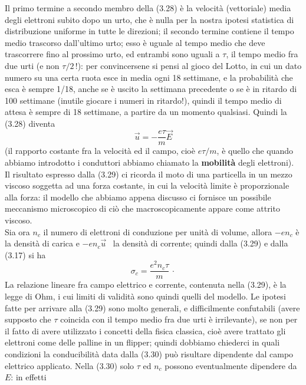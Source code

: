 Il primo termine a secondo membro della (3.28) \`e la velocit\`a (vettoriale)
media degli elettroni subito dopo un urto, che \`e nulla per la nostra ipotesi
statistica di distribuzione uniforme in tutte le direzioni; il secondo termine
contiene il tempo medio trascorso dall'ultimo urto; esso \`e uguale al tempo
medio che deve trascorrere fino al prossimo urto, ed entrambi sono uguali a
$\tau$, il tempo medio fra due urti (e non $\tau/2\,$!): per convincersene si
pensi al gioco del Lotto, in cui un dato numero su una certa ruota esce in media
ogni 18 settimane, e la probabilit\`a che esca \`e sempre 1/18, anche se \`e
uscito la settimana precedente o se \`e in ritardo di 100 settimane (inutile
giocare i numeri in ritardo!), quindi il tempo medio di attesa \`e sempre di 18
settimane, a partire da un momento qualsiasi. Quindi la (3.28) diventa
\begin{equation}
  \vec u=-\frac{e\tau}{m}\vec E
  \tag{3.29}
\end{equation}
(il rapporto costante fra la velocit\`a ed il campo, cio\`e $e\tau/m$, \`e
quello che quando abbiamo introdotto i conduttori abbiamo chiamato la
\textbf{mobilit\`a} degli elettroni).\\
Il risultato espresso dalla (3.29) ci ricorda il moto di una particella in un
mezzo viscoso soggetta ad una forza costante, in cui la velocit\`a limite \`e
proporzionale alla forza: il modello che abbiamo appena discusso ci fornisce un
possibile meccanismo microscopico di ci\`o che macroscopicamente appare come
attrito viscoso.\\
Sia ora $n_c$ il numero di elettroni di conduzione per unit\`a di volume, allora
$-en_c$ \`e la densit\`a di carica e $-en_c\vec u$ \ la densit\`a di corrente;
quindi dalla (3.29) e dalla (3.17) si ha
\begin{equation}
  \sigma_c=\frac{e^2n_c\tau}{m}\,\cdot
  \tag{3.30}
\end{equation}
La relazione lineare fra campo elettrico e corrente, contenuta nella (3.29), \`e
la legge di Ohm, i cui limiti di validit\`a sono quindi quelli del modello. Le
ipotesi fatte per arrivare alla (3.29) sono molto generali, e difficilmente
confutabili (avere supposto che $\tau$ coincida con il tempo medio fra due urti
\`e irrilevante), se non per il fatto di avere utilizzato i concetti della
fisica classica, cio\`e avere trattato gli elettroni come delle palline in un
flipper; quindi dobbiamo chiederci in quali condizioni la conducibilit\`a data
dalla (3.30) pu\`o risultare dipendente dal campo elettrico applicato. Nella
(3.30) solo $\tau$ ed $n_c$ possono eventualmente dipendere da $E$: in effetti
